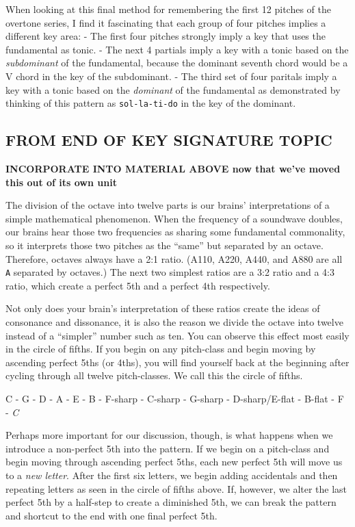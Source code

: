 \documentclass{book}
\begin{document}
When looking at this final method for remembering the first 12 pitches of the
overtone series, I find it fascinating that each group of four pitches implies
a different key area: - The first four pitches strongly imply a key that uses
the fundamental as tonic. - The next 4 partials imply a key with a tonic based
on the \emph{subdominant} of the fundamental, because the dominant seventh
chord would be a V chord in the key of the subdominant. - The third set of
four paritals imply a key with a tonic based on the \emph{dominant} of the
fundamental as demonstrated by thinking of this pattern as
\texttt{sol-la-ti-do} in the key of the dominant.

\hypertarget{from-end-of-key-signature-topic}{%
\subsection{FROM END OF KEY SIGNATURE
TOPIC}\label{from-end-of-key-signature-topic}}

\textbf{INCORPORATE INTO MATERIAL ABOVE now that we've moved this out of its
own unit}

The division of the octave into twelve parts is our brains' interpretations of
a simple mathematical phenomenon. When the frequency of a soundwave doubles,
our brains hear those two frequencies as sharing some fundamental commonality,
so it interprets those two pitches as the ``same'' but separated by an octave.
Therefore, octaves always have a 2:1 ratio. (A110, A220, A440, and A880 are
all \texttt{A} separated by octaves.) The next two simplest ratios are a 3:2
ratio and a 4:3 ratio, which create a perfect 5th and a perfect 4th
respectively.

Not only does your brain's interpretation of these ratios create the ideas of
consonance and dissonance, it is also the reason we divide the octave into
twelve instead of a ``simpler'' number such as ten. You can observe this
effect most easily in the circle of fifths. If you begin on any pitch-class
and begin moving by ascending perfect 5ths (or 4ths), you will find yourself
back at the beginning after cycling through all twelve pitch-classes. We call
this the circle of fifths.

C - G - D - A - E - B - F-sharp - C-sharp - G-sharp - D-sharp/E-flat - B-flat
- F - \emph{C}

Perhaps more important for our discussion, though, is what happens when we
introduce a non-perfect 5th into the pattern. If we begin on a pitch-class and
begin moving through ascending perfect 5ths, each new perfect 5th will move us
to a \emph{new letter}. After the first six letters, we begin adding
accidentals and then repeating letters as seen in the circle of fifths above.
If, however, we alter the last perfect 5th by a half-step to create a
diminished 5th, we can break the pattern and shortcut to the end with one
final perfect 5th.
\end{document}
